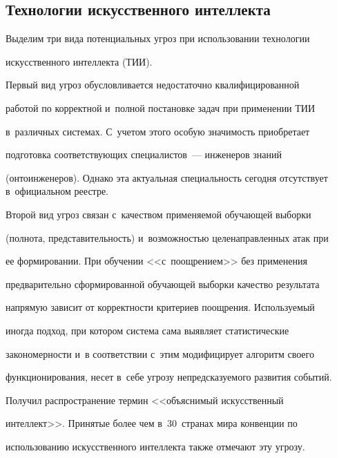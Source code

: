 \subsection{Технологии искусственного интеллекта }





\vspace*{-2pt}





   Выделим три вида потенциальных угроз при использовании технологии 


искусственного интеллекта (ТИИ).


   


   Первый вид угроз обусловливается недостаточно квалифицированной 


работой по корректной и~полной постановке задач при применении ТИИ 


в~различных системах. С~учетом этого особую значимость приобретает 


подготовка соответствующих специалистов~--- инженеров знаний 


(онтоинженеров). Однако эта актуальная специальность сегодня отсутствует в~официальном реестре. 


   


   Второй вид угроз связан с~качеством применяемой обучающей выборки 


(полнота, представительность) и~возможностью целенаправленных атак при 


ее формировании. При обучении <<с~поощрением>> без применения 


предварительно сформированной обучающей выборки качество результата 


напрямую зависит от корректности критериев поощрения. Используемый 


иногда подход, при котором система сама выявляет статистические 


закономерности и~в соответствии с~этим модифицирует алгоритм своего 


функционирования, несет в~себе угрозу непредсказуемого развития событий. 


Получил распространение термин <<объяснимый искусственный 


интеллект>>. Принятые более чем в~30~странах мира конвенции по 


использованию искусственного интеллекта также отмечают эту угрозу. 


